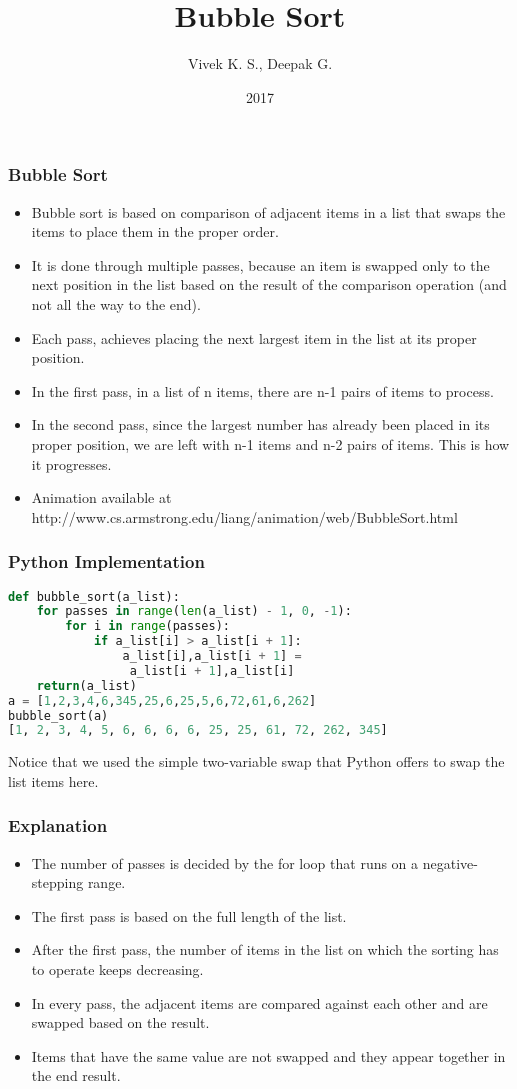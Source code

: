\documentclass{beamer}
\title{Bubble Sort}
\author{Vivek K. S., Deepak G.}
\institute{Information Systems Decision Sciences (ISDS)\\
MUMA College of Business\\
University of South Florida \\
Tampa, Florida}
\date{2017}
\begin{document}
\frame{\titlepage}

\begin{frame}
\frametitle{Bubble Sort}
\begin{itemize}
\item Bubble sort is based on comparison of adjacent items in a list that swaps the items to place them in the proper order.
\item It is done through multiple passes, because an item is swapped only to the next position in the list based on the result of the comparison operation (and not all the way to the end).
\item Each pass, achieves placing the next largest item in the list at its proper position.
\item In the first pass, in a list of n items, there are n-1 pairs of items to process.
\item In the second pass, since the largest number has already been placed in its proper  position, we are left with n-1 items and n-2 pairs of items. This is how it progresses.
\item Animation available at http://www.cs.armstrong.edu/liang/animation/web/BubbleSort.html
\end{itemize}
\end{frame}

\begin{frame}[fragile]
\frametitle{Python Implementation}
\begin{lstlisting}[language=Python]
def bubble_sort(a_list):
    for passes in range(len(a_list) - 1, 0, -1):
        for i in range(passes):
            if a_list[i] > a_list[i + 1]:
                a_list[i],a_list[i + 1] =
                 a_list[i + 1],a_list[i]
    return(a_list)
a = [1,2,3,4,6,345,25,6,25,5,6,72,61,6,262]
bubble_sort(a)
[1, 2, 3, 4, 5, 6, 6, 6, 6, 25, 25, 61, 72, 262, 345]
\end{lstlisting}
Notice that we used the simple two-variable swap that Python offers to swap the list items here.
\end{frame}

\begin{frame}
\frametitle{Explanation}
\begin{itemize}
\item The number of passes is decided by the for loop that runs on a negative-stepping range.
\item The first pass is based on the full length of the list.
\item After the first pass, the number of items in the list on which the sorting has to operate keeps decreasing.
\item In every pass, the adjacent items are compared against each other and are swapped based on the result.
\item Items that have the same value are not swapped and they appear together in the end result.
\end{itemize}
\end{frame}
\end{document}

